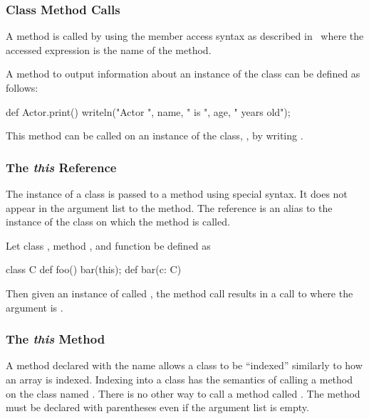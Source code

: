 \subsubsection{Class Method Calls}
\label{Class_Method_Calls}

A method is called by using the member access syntax as described
in~ where the accessed expression is
the name of the method.

\begin{example}
A method to output information about an instance of the 
class can be defined as follows:
\begin{chapel}
def Actor.print() {
  writeln("Actor ", name, " is ", age, " years old");
}
\end{chapel}
This method can be called on an instance of the 
class, , by writing .
\end{example}

\subsubsection{The {\em this} Reference}
\label{The_em_this_Reference}

The instance of a class is passed to a method using special syntax.
It does not appear in the argument list to the method.  The
reference  is an alias to the instance of the class on
which the method is called.

\begin{example}
Let class , method , and function  be
defined as
\begin{chapel}
class C {
  def foo() {
    bar(this);
  }
}
def bar(c: C) { }
\end{chapel}
Then given an instance of  called , the method
call  results in a call to  where the argument
is .
\end{example}

\subsubsection{The {\em this} Method}
\label{The_em_this_Method}

A method declared with the name  allows a class to be
``indexed'' similarly to how an array is indexed.  Indexing into a
class has the semantics of calling a method on the class
named .  There is no other way to call a method
called .  The  method must be declared with
parentheses even if the argument list is empty.

